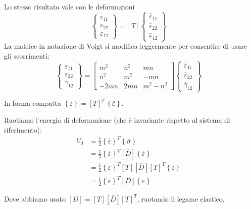 Lo stesso risultato vale con le deformazioni 
\begin{equation*}
    \begin{Bmatrix}
    \varepsilon_{11} \\
    \varepsilon_{22} \\
    \varepsilon_{12}
\end{Bmatrix}
=
[T]
\begin{Bmatrix}
    \bar{\varepsilon}_{11} \\
    \bar{\varepsilon}_{22} \\
    \bar{\varepsilon}_{12}
\end{Bmatrix}
\end{equation*}
La matrice in notazione di Voigt si modifica leggermente per consentire di usare gli scorrimenti:
\begin{equation*}
    \begin{Bmatrix}
    \varepsilon_{11} \\
    \varepsilon_{22} \\
    \gamma_{12}
\end{Bmatrix}
=
\begin{bmatrix}
    m^2 & n^2 & mn \\
    n^2 & m^2 & -mn \\
    -2mn & 2mn & m^2-n^2
\end{bmatrix}
\begin{Bmatrix}
    \bar{\varepsilon}_{11} \\
    \bar{\varepsilon}_{22} \\
    \bar{\gamma}_{12}
\end{Bmatrix}
\end{equation*}

In forma compatta $\left\{\varepsilon \right\}=\left[T\right]^T\,\left\{ \bar{\varepsilon}\right\} $.

Ruotiamo l'energia di deformazione (che è invariante rispetto al sistema di riferimento):
\begin{align*}
    V_d  &=\frac{1}{2}\left\{ \bar{\varepsilon}\right\}^T\left\{ \bar{\sigma}\right\}\\
     &=\frac{1}{2}\left\{ \bar{\varepsilon}\right\}^T[\bar{D}]\left\{ \bar{\varepsilon}\right\}\\
      &=\frac{1}{2}\left\{ {\varepsilon}\right\}^T  \left[T\right][\bar{D}]\left[T\right]^T\left\{ {\varepsilon}\right\}\\
           &=\frac{1}{2}\left\{ {\varepsilon}\right\}^T  [D]\left\{ {\varepsilon}\right\}
\end{align*}


Dove abbiamo usato $[D] =  \left[T\right][\bar{D}]\left[T\right]^T$, ruotando il legame elastico.




